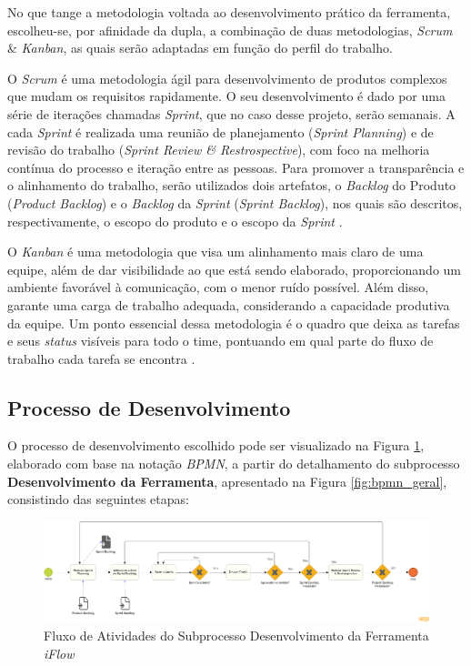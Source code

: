 \label{sec:metodologia_desenvolvimento}

No que tange a metodologia voltada ao desenvolvimento prático da ferramenta, escolheu-se, por afinidade da dupla, a combinação de duas metodologias, \textit{Scrum} \& \textit{Kanban}, as quais serão adaptadas em função do perfil do trabalho.

O \textit{Scrum} é uma metodologia ágil para desenvolvimento de produtos complexos que mudam os requisitos rapidamente. O seu desenvolvimento é dado por uma série de iterações chamadas \textit{Sprint}, que no caso desse projeto, serão semanais. A cada \textit{Sprint} é realizada uma reunião de planejamento (\textit{Sprint Planning}) e de revisão do trabalho (\textit{Sprint Review \& Restrospective}), com foco na melhoria contínua do processo e iteração entre as pessoas. Para promover a transparência e o alinhamento do trabalho, serão utilizados dois artefatos, o \textit{Backlog} do Produto (\textit{Product Backlog}) e o \textit{Backlog} da \textit{Sprint} (\textit{Sprint Backlog}), nos quais  são descritos, respectivamente, o
escopo do produto e o escopo da \textit{Sprint} \cite{carolipaulo2021}.

O \textit{Kanban} é uma metodologia que visa um alinhamento mais claro de uma equipe, além de dar visibilidade ao que está sendo elaborado, proporcionando um ambiente favorável à comunicação, com o menor ruído possível. Além disso, garante uma carga de trabalho adequada, considerando a capacidade produtiva da equipe. Um ponto essencial dessa metodologia é o quadro que deixa as tarefas e seus \textit{status} visíveis para todo o time, pontuando em qual parte do fluxo de trabalho cada tarefa se encontra \cite{K_Condensed}.

\subsection{Processo de Desenvolvimento}

\label{sec:met_dev}

O processo de desenvolvimento escolhido pode ser visualizado na Figura \ref{fig:bpmn_dev}, elaborado com base na notação \textit{BPMN},  a partir do detalhamento do subprocesso \textbf{Desenvolvimento da Ferramenta}, apresentado na Figura \ref{fig:bpmn_geral}, consistindo das seguintes etapas:

\begin{figure}[H]
    \begin{center}
        \caption{Fluxo de Atividades do Subprocesso Desenvolvimento da Ferramenta \textit{iFlow}}
        \label{fig:bpmn_dev}
        \includegraphics[scale=0.23]{figuras/Metodologia/bpmn_dev.png}
    \end{center}
\end{figure}

